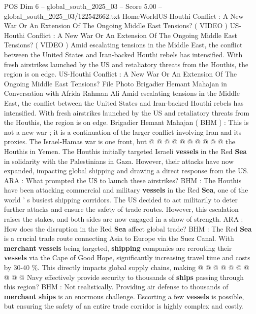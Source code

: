 \begin{textsample}{POS Dim 6 – global\_south\_2025\_03 – Score 5.00 – global\_south\_2025\_03/122542662.txt}  \label{ex:f6_pos_224}
HomeWorldUS-Houthi Conflict : A New War Or An Extension Of The Ongoing Middle East Tensions? ( VIDEO ) US-Houthi Conflict : A New War Or An Extension Of The Ongoing Middle East Tensions? ( VIDEO ) Amid escalating tensions in the Middle East, the conflict between the United States and Iran-backed Houthi rebels has intensified.
With fresh airstrikes launched by the US and retaliatory threats from the Houthis, the region is on edge.
US-Houthi Conflict : A New War Or An Extension Of The Ongoing Middle East Tensions?
File Photo Brigadier Hemant Mahajan in Conversation with Afrida Rahman Ali Amid escalating tensions in the Middle East, the conflict between the United States and Iran-backed Houthi rebels has intensified.
With fresh airstrikes launched by the US and retaliatory threats from the Houthis, the region is on edge.
Brigadier Hemant Mahajan ( BHM ) : This is not a new war ; it is a continuation of the larger conflict involving Iran and its proxies.
The Israel-Hamas war is one front, but @ @ @ @ @ @ @ @ @ @ the Houthis in Yemen.
The Houthis initially targeted Israeli \textbf{vessels} in the Red \textbf{Sea} in solidarity with the Palestinians in Gaza.
However, their attacks have now expanded, impacting global shipping and drawing a direct response from the US.
ARA : What prompted the US to launch these airstrikes?
BHM : The Houthis have been attacking commercial and military \textbf{vessels} in the Red \textbf{Sea}, one of the world ' s busiest shipping corridors.
The US decided to act militarily to deter further attacks and ensure the safety of trade routes.
However, this escalation raises the stakes, and both sides are now engaged in a show of strength.
ARA : How does the disruption in the Red \textbf{Sea} affect global trade?
BHM : The Red \textbf{Sea} is a crucial trade route connecting Asia to Europe via the Suez Canal.
With \textbf{merchant} \textbf{vessels} being targeted, \textbf{shipping} companies are rerouting their \textbf{vessels} via the Cape of Good Hope, significantly increasing travel time and costs by 30-40 \%.
This directly impacts global supply chains, making @ @ @ @ @ @ @ @ @ @ Navy effectively provide security to thousands of \textbf{ships} passing through this region?
BHM : Not realistically.
Providing air defense to thousands of \textbf{merchant} \textbf{ships} is an enormous challenge.
Escorting a few \textbf{vessels} is possible, but ensuring the safety of an entire trade corridor is highly complex and costly.

\end{textsample}
